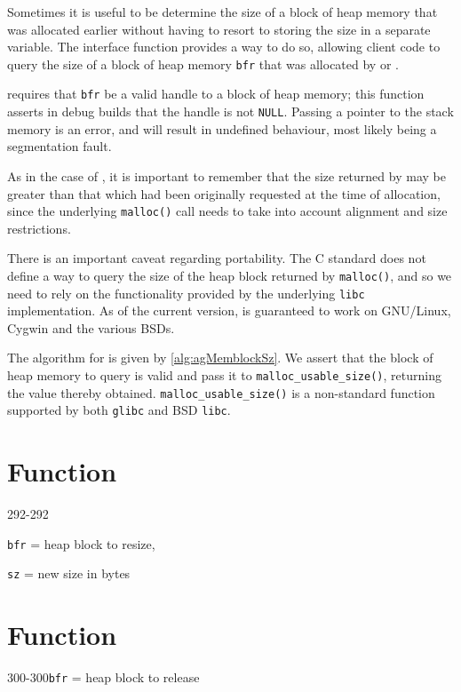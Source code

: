 
Sometimes it is useful to be determine the size of a block of heap memory that
was allocated earlier without having to resort to storing the size in a separate
variable. The interface function \agMemblockSz provides a way to do so, allowing
client code to query the size of a block of heap memory \verb|bfr| that was 
allocated by \agMemblockNew or \agMemblockCopy. 

\agMemblockSz requires that \verb|bfr| be a valid handle to a block of heap 
memory; this function asserts in debug builds that the handle is not 
\verb|NULL|. Passing a pointer to the stack memory is an error, and will result 
in undefined behaviour, most likely being a segmentation fault.

As in the case of \agMemblockNew, it is important to remember that the size
returned by \agMemblockSz may be greater than that which had been originally
requested at the time of allocation, since the underlying \verb|malloc()| call
needs to take into account alignment and size restrictions.


There is an important caveat regarding portability. The C standard does not
define a way to query the size of the heap block returned by \verb|malloc()|,
and so we need to rely on the functionality provided by the underlying
\verb|libc| implementation. As of the current version, \agMemblockSz is
guaranteed to work on GNU/Linux, Cygwin and the various BSDs.

The algorithm for \agMemblockSz is given by \ref{alg:agMemblockSz}. We assert
that the block of heap memory to query is valid and pass it to
\verb|malloc_usable_size()|, returning the value thereby obtained.
\verb|malloc_usable_size()| is a non-standard function supported by both
\verb|glibc| and BSD \verb|libc|.


%
%
\section{Function \agMemblockResize}
  {292-292}{\texttt{bfr} = heap block to resize,\par\texttt{sz} = new size in
  bytes}
\kant[1]


%
%
\section{Function \agMemblockFree}
  {300-300}{\texttt{bfr} = heap block to release}
\kant[1]
